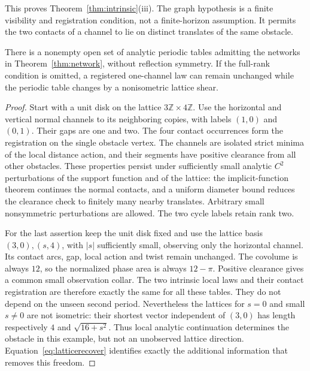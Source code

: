 This proves Theorem~\ref{thm:intrinsic}(iii). The graph hypothesis is a
finite visibility and registration condition, not a finite-horizon
assumption. It permits the two contacts of a channel to lie on distinct
translates of the same obstacle.

\begin{proposition}
\label{prop:networkexamples}
There is a nonempty open set of analytic periodic tables admitting the
networks in Theorem~\ref{thm:network}, without reflection symmetry.
If the full-rank condition is omitted, a registered one-channel law can
remain unchanged while the periodic table changes by a nonisometric
lattice shear.
\end{proposition}
\begin{proof}
Start with a unit disk on the lattice $3\mathbb Z\times4\mathbb Z$.
Use the horizontal and vertical normal channels to its neighboring
copies, with labels $(1,0)$ and $(0,1)$. Their gaps are one and two.
The four contact occurrences form the registration on the single
obstacle vertex. The channels are isolated strict minima of the local
distance action, and their segments have positive clearance from all
other obstacles. These properties persist under sufficiently small
analytic $C^2$ perturbations of the support function and of the lattice:
the implicit-function theorem continues the normal contacts, and a
uniform diameter bound reduces the clearance check to finitely many
nearby translates. Arbitrary small nonsymmetric perturbations are
allowed. The two cycle labels retain rank two.

For the last assertion keep the unit disk fixed and use the lattice
basis $(3,0),(s,4)$, with $|s|$ sufficiently small, observing only the
horizontal channel. Its contact arcs, gap, local action and twist remain
unchanged. The covolume is always $12$, so the normalized phase area is
always $12-\pi$. Positive clearance gives a common small observation
collar. The two intrinsic local laws and their contact registration
are therefore exactly the same for all these tables. They do not depend
on the unseen second period. Nevertheless the lattices for $s=0$ and
small $s\ne0$ are not isometric: their shortest vector independent of
$(3,0)$ has length respectively $4$ and $\sqrt{16+s^2}$.
Thus local analytic continuation determines the obstacle in this example,
but not an unobserved lattice direction. Equation~\eqref{eq:latticerecover}
identifies exactly the additional information that removes this freedom.
\end{proof}
